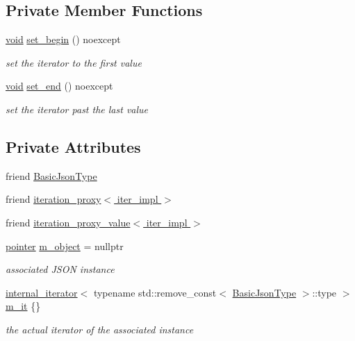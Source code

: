 \subsection*{Private Member Functions}
\begin{DoxyCompactItemize}
\item 
\hyperlink{namespacenlohmann_1_1detail_a59fca69799f6b9e366710cb9043aa77d}{void} \hyperlink{classnlohmann_1_1detail_1_1iter__impl_a5d5f92c7f6848814bc82cf7e4e541820}{set\+\_\+begin} () noexcept
\begin{DoxyCompactList}\small\item\em set the iterator to the first value \end{DoxyCompactList}\item 
\hyperlink{namespacenlohmann_1_1detail_a59fca69799f6b9e366710cb9043aa77d}{void} \hyperlink{classnlohmann_1_1detail_1_1iter__impl_a23e50ad4c13aa62d9ac7f60a123823ee}{set\+\_\+end} () noexcept
\begin{DoxyCompactList}\small\item\em set the iterator past the last value \end{DoxyCompactList}\end{DoxyCompactItemize}
\subsection*{Private Attributes}
\begin{DoxyCompactItemize}
\item 
friend \hyperlink{classnlohmann_1_1detail_1_1iter__impl_abf18f18793f84b0222aebb5a2a87da7a}{Basic\+Json\+Type}
\item 
friend \hyperlink{classnlohmann_1_1detail_1_1iter__impl_a28328d17a18d9754c89c5c8159677a6f}{iteration\+\_\+proxy$<$ iter\+\_\+impl $>$}
\item 
friend \hyperlink{classnlohmann_1_1detail_1_1iter__impl_ac501dc2374b4d17a884fc9a656e80d5a}{iteration\+\_\+proxy\+\_\+value$<$ iter\+\_\+impl $>$}
\item 
\hyperlink{classnlohmann_1_1detail_1_1iter__impl_a69e52f890ce8c556fd68ce109e24b360}{pointer} \hyperlink{classnlohmann_1_1detail_1_1iter__impl_aca84f84be598bdfaaddd23d928c42bbb}{m\+\_\+object} = nullptr
\begin{DoxyCompactList}\small\item\em associated J\+S\+ON instance \end{DoxyCompactList}\item 
\hyperlink{structnlohmann_1_1detail_1_1internal__iterator}{internal\+\_\+iterator}$<$ typename std\+::remove\+\_\+const$<$ \hyperlink{classnlohmann_1_1detail_1_1iter__impl_abf18f18793f84b0222aebb5a2a87da7a}{Basic\+Json\+Type} $>$\+::type $>$ \hyperlink{classnlohmann_1_1detail_1_1iter__impl_a8a86a7c0d4af0cc4ab345b6f0e13cdfa}{m\+\_\+it} \{\}
\begin{DoxyCompactList}\small\item\em the actual iterator of the associated instance \end{DoxyCompactList}\end{DoxyCompactItemize}
